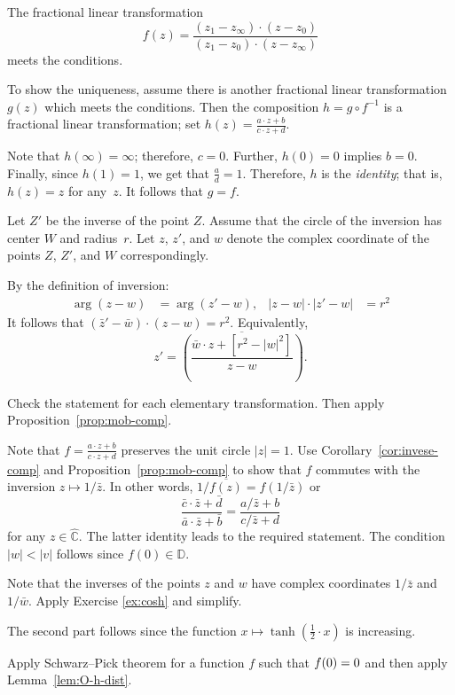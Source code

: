 The fractional linear transformation
\[f(z)=\frac{(z_1-z_\infty)\cdot(z-z_0)}{(z_1-z_0)\cdot(z-z_\infty)}\]
meets the conditions.

To show the uniqueness, assume there is another fractional linear transformation
$g(z)$ which meets the conditions.
Then the composition
$h=g\circ f^{-1}$ 
is a fractional linear transformation; set
$h(z)=\tfrac{a\cdot z+b}{c\cdot z+d}$.

Note that $h(\infty)=\infty$;
therefore, $c=0$.
Further, $h(0)=0$ implies $b=0$.
Finally, since $h(1)=1$, we get that $\tfrac ad=1$.
Therefore, $h$ is the \emph{identity};
that is, $h(z)=z$ for any~$z$.
It follows that $g=f$.

Let $Z'$ be the inverse of the point $Z$.
Assume that the circle of the inversion has center $W$ and radius~$r$.
Let $z$, $z'$, and $w$ denote the complex coordinate of the points $Z$, $Z'$, and $W$ correspondingly.

By the definition of inversion:
\begin{align*}
\arg (z-w)&=\arg (z'-w),
&
|z-w|\cdot|z'-w|&=r^2
\end{align*}
It follows that $(\bar z'-\bar w)\cdot ( z- w)= r^2$.
Equivalently,
\[z'=\overline{\left(\frac{\bar w\cdot z+[r^2-|w|^2]}{z- w}\right)}.\]

 
Check the statement for each elementary transformation.
Then apply Proposition~\ref{prop:mob-comp}.

Note that $f=\tfrac{a\cdot z+b}{c\cdot z+d}$ preserves the unit circle $|z|=1$.
Use Corollary~\ref{cor:invese-comp} and Proposition~\ref{prop:mob-comp} to show that $f$ commutes with the inversion $z\mapsto 1/\bar z$.
In other words, $1/\overline{f(z)}=f(1/\bar z)$ or
\[\frac{\bar c\cdot \bar z+\bar d}{\bar a\cdot \bar z+\bar b}
=\frac{a/\bar z+b}{c/\bar z+d}\]
for any $z\in\hat{\mathbb{C}}$.
The latter identity leads to the required statement. 
The condition $|w|<|v|$ follows since $f(0)\in\mathbb{D}$.

Note that the inverses of the points $z$ and $w$ have complex coordinates $1/\bar z$ and $1/\bar w$.
Apply Exercise \ref{ex:cosh} and simplify.

The second part follows since the function $x\mapsto \tanh(\tfrac12\cdot x)$ is increasing.

Apply Schwarz--Pick theorem for a function $f$ such that $f(0)\z=0$ and then apply Lemma~\ref{lem:O-h-dist}.


